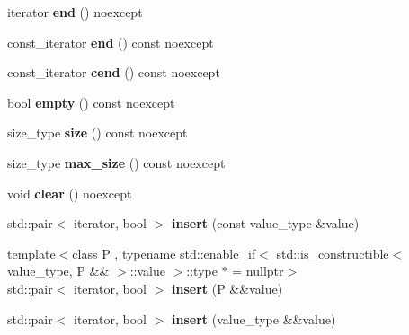 \begin{DoxyCompactItemize}
iterator {\bfseries end} () noexcept
\item 
\mbox{\label{classtsl_1_1robin__map_ae7a9d4bab3c77e1cce3f4a392a8297d2}} 
const\+\_\+iterator {\bfseries end} () const noexcept
\item 
\mbox{\label{classtsl_1_1robin__map_aa5423ada7fcdc300b8c88a3e7bc57b93}} 
const\+\_\+iterator {\bfseries cend} () const noexcept
\item 
\mbox{\label{classtsl_1_1robin__map_a3ad7d1bec62b3f61b45e1fdcf3020a4e}} 
bool {\bfseries empty} () const noexcept
\item 
\mbox{\label{classtsl_1_1robin__map_ab78f51c664bdfa799fa34547876bba31}} 
size\+\_\+type {\bfseries size} () const noexcept
\item 
\mbox{\label{classtsl_1_1robin__map_a2a3e9d8728cf23c8e318ffd2d4e80f42}} 
size\+\_\+type {\bfseries max\+\_\+size} () const noexcept
\item 
\mbox{\label{classtsl_1_1robin__map_a1ae414f0877f522109b46f8b4f7349be}} 
void {\bfseries clear} () noexcept
\item 
\mbox{\label{classtsl_1_1robin__map_a7fc67c60fbdd998078c995b369bcf530}} 
std\+::pair$<$ iterator, bool $>$ {\bfseries insert} (const value\+\_\+type \&value)
\item 
\mbox{\label{classtsl_1_1robin__map_ab5880a79c1b5f53befda5f638974a52e}} 
{\footnotesize template$<$class P , typename std\+::enable\+\_\+if$<$ std\+::is\+\_\+constructible$<$ value\+\_\+type, P \&\& $>$\+::value $>$\+::type $\ast$  = nullptr$>$ }\\std\+::pair$<$ iterator, bool $>$ {\bfseries insert} (P \&\&value)
\item 
\mbox{\label{classtsl_1_1robin__map_a68bbb12dbd0b5d37cffe7cf63c7b4007}} 
std\+::pair$<$ iterator, bool $>$ {\bfseries insert} (value\+\_\+type \&\&value)
\item 
\mbox{\label{classtsl_1_1robin__map_a15f6a0a5629d8551d8b45dbeb695105f}} 

\end{DoxyCompactItemize}
